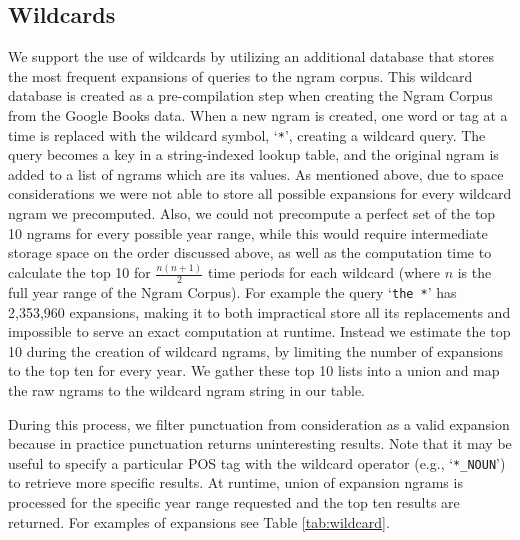 \documentclass[11pt,a4paper]{article}
\newcommand{\query}[1]{\texttt{#1}}
\begin{document}
\subsection{Wildcards}
\label{sec:wildcards}
	We support the use of wildcards by utilizing an additional database that stores the most frequent expansions of queries to the ngram corpus. This wildcard database is created as a pre-compilation step when creating the Ngram Corpus from the Google Books data. When a new ngram is created, one word or tag at a time is replaced with the wildcard symbol, `\query{*}', creating a wildcard query. The query becomes a key in a string-indexed lookup table, and the original ngram is added to a list of ngrams which are its values. As mentioned above, due to space considerations we were not able to store all possible expansions for every wildcard ngram we precomputed. Also, we could not precompute a perfect set of the top 10 ngrams for every possible year range, while this would require intermediate storage space on the order discussed above, as well as the computation time to calculate the top 10 for $\frac{n(n+1)}{2}$ time periods for each wildcard (where $n$ is the full year range of the Ngram Corpus). For example the query `\query{the *}' has 2,353,960 expansions, making it to both impractical store all its replacements and impossible to serve an exact computation at runtime. Instead we estimate the top 10 during the creation of wildcard ngrams, by limiting the number of expansions to the top ten for every year. We gather these top 10 lists into a union and map the raw ngrams to the wildcard ngram string in our table. 
	
	During this process, we filter punctuation from consideration as a valid expansion because in practice punctuation returns uninteresting results. Note that it may be useful to specify a particular POS tag with the wildcard operator (e.g., `\query{*\_NOUN}') to retrieve more specific results. At runtime, union of expansion ngrams is processed for the specific year range requested and the top ten results are returned. For examples of expansions see Table \ref{tab:wildcard}. 
\end{document}
